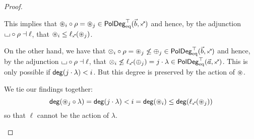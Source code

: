 \documentclass[a4paper]{memoir}
\begin{document}
\begin{proof}
\begin{enumerate}
\begin{itemize}
			This implies that $\isopol_i \circ \rho = \isopol_j \in \poldegeqtop(\vec b, \ypolar)$ and hence, by the adjunction ${\llcorner\hspace{-.4ex}\lrcorner} \circ \rho \dashv \ell$, that $\isopol_i \leq \ell_{\ypolar}(\isopol_j)$.
			
			On the other hand, we have that $\mixpol_i \circ \rho = \isopol_j \not\leq \pospol_j \in \poldegeqtop(\vec b, \ypolar)$ and hence, by the adjunction ${\llcorner\hspace{-.4ex}\lrcorner} \circ \rho \dashv \ell$, that $\mixpol_i \not\leq \ell_\ypolar(\pospol_j) = j \cdot \lambda \in \poldegeqtop(\vec a, \ypolar)$.
			This is only possible if $\mathsf{deg}(j \cdot \lambda) < i$.
			But this degree is preserved by the action of ${\oast}$.
			
			We tie our findings together:
			\[
				\getdeg(\isopol_j \circ \lambda) = \getdeg(j \cdot \lambda) < i = \getdeg(\isopol_i) \leq \getdeg(\ell_\ypolar(\isopol_j))
			\]
			so that $\ell$ cannot be the action of $\lambda$.
			

\end{itemize}
\end{enumerate}
\end{proof}
\end{document}
